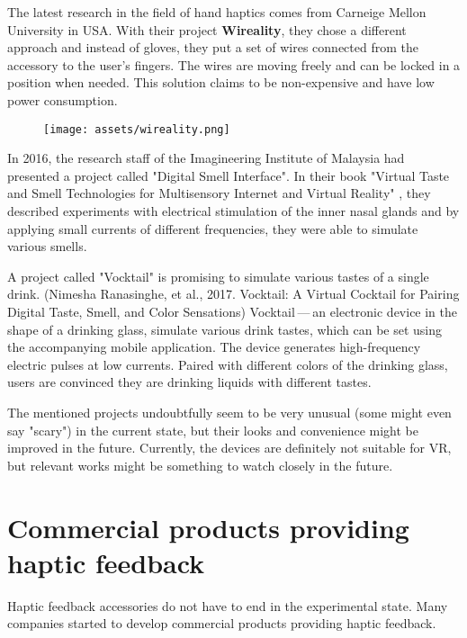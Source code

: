 The latest research in the field of hand haptics comes from Carneige Mellon
University in USA. With their project \textbf{Wireality}, they chose a different
approach and instead of gloves, they put a set of wires connected from the
accessory to the user’s fingers. The wires are moving freely and can be locked
in a position when needed. This solution claims to be non-expensive and
have low power consumption. \hyperlink{wireality}{}


\begin{figure}[h]{}
\centering\texttt{[image: assets/wireality.png]}
\caption{}

\end{figure}

In 2016, the research staff of the Imagineering Institute of Malaysia
had presented a project called "Digital Smell Interface". In their book
"Virtual Taste and Smell Technologies for Multisensory Internet and Virtual
Reality" \hyperlink{vrstmivr}{}, they described experiments with electrical stimulation
of the inner nasal glands and by applying small currents of different
frequencies, they were able to simulate various smells.


A project called "Vocktail" is promising to simulate various tastes of a single
drink.
(Nimesha Ranasinghe, et al., 2017. Vocktail: A Virtual Cocktail for Pairing
Digital Taste, Smell, and Color Sensations) \hyperlink{vocktail}{} Vocktail — an electronic
device in the shape of a drinking glass, simulate various drink tastes,
which can be set using the accompanying mobile application. The device
generates high-frequency electric pulses at low currents. Paired with
different colors of the drinking glass, users are convinced they are drinking
liquids with different tastes.


The mentioned projects undoubtfully seem to be very unusual
(some might even say "scary") in the current state, but their looks and convenience
might be improved in the future. Currently, the devices are definitely not
suitable for VR, but relevant works might be something to
watch closely in the future.


\hypertarget{x-commercial-products-providing-haptic-feedback}{\section{Commercial products providing haptic feedback}}
Haptic feedback accessories do not have to end in the experimental state.
Many companies started to develop commercial products providing haptic feedback.


